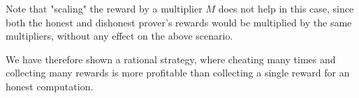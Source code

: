 Note that "scaling" the reward by a multiplier $M$ does not help in this case, since both the honest and dishonest prover's rewards would be multiplied by 
the same multipliers, without any effect on the above scenario. 

We have therefore shown a rational strategy, where cheating many times and collecting many rewards is more profitable than collecting a single reward for an honest computation. 
